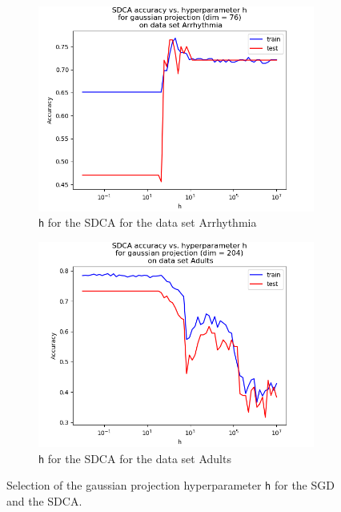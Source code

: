 \documentclass{article}
\begin{document}
\begin{figure}[H]
	\begin{subfigure}[t]{0.45\linewidth}
		\includegraphics[width=\linewidth]{SDCA_identity_arrhythmia.png}
		\caption{\texttt{h} for the SDCA for the data set Arrhythmia}
	\end{subfigure}
	\begin{subfigure}[t]{0.45\linewidth}
		\includegraphics[width=\linewidth]{SDCA_identity_adults.png}
		\caption{\texttt{h} for the SDCA for the data set Adults}
	\end{subfigure}

	\caption{Selection of the gaussian projection hyperparameter \texttt{h} for the SGD and the SDCA.}
\end{figure}
\end{document}
